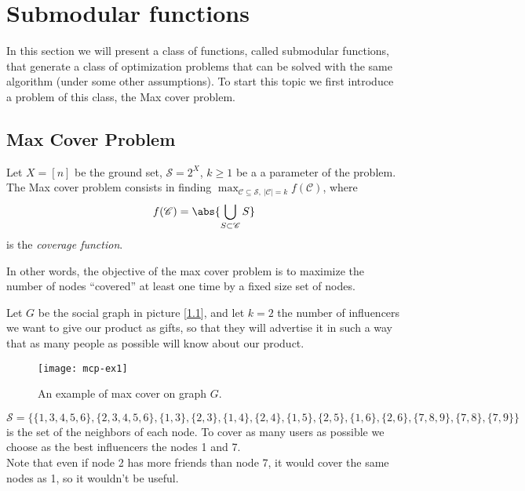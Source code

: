 \chapter[Submodular functions]{Submodular functions\raisebox{.3\baselineskip}{\normalsize\footnotemark}}
\label{sec:submodular-chapter}

In this section we will present a class of functions, called submodular functions, that generate a class of optimization problems that can be solved with the same algorithm (under some other assumptions). To start this topic we first introduce a problem of this class, the Max cover problem.

\section{Max Cover Problem}

\begin{defn}\label{max-cover}
    Let $X=[n]$ be the ground set, $\mathscr{S}=2^X$, $k\geq1$ be a a parameter of the problem. The Max cover problem consists in finding
    $\max_{\mathscr{C} \subseteq \mathscr{S},\ |\mathscr{C}|=k} f(\mathscr{C})$, where
    \begin{equation}\label{eq:coverage}
        f(\mathscr{C}) = \abs{\bigcup_{S \subset \mathscr{C}} S}
    \end{equation}
    is the \textit{coverage function}.
\end{defn}

In other words, the objective of the max cover problem is to maximize the number of nodes ``covered'' at least one time by a fixed size set of nodes.

\begin{ex}\label{ex:mcp-ex1}
    Let $G$ be the social graph in picture [\ref{fig:mcp-ex1}], and let $k=2$ the number of influencers we want to give our product as gifts, so that they will advertise it in such a way that as many people as possible will know about our product.
    
    \begin{figure}[h!]
        \centering
        \texttt{[image: mcp-ex1]}
        \caption{An example of max cover on graph $G$.}
        \label{fig:mcp-ex1}
    \end{figure}

    $\mathscr{S} = \{ \{1,3,4,5,6\}, \{2,3,4,5,6\}, \{1,3\}, \{2,3\}, \{1,4\}, \{2,4\}, \{1,5\}, \{2,5\}, \{1,6\}, \{2,6\}, \{7,8,9\}, \{7,8\}, \{7,9\} \}$ is the set of the neighbors of each node. To cover as many users as possible we choose as the best influencers the nodes 1 and 7.\\
    Note that even if node 2 has more friends than node 7, it would cover the same nodes as 1, so it wouldn't be useful.
\end{ex}

